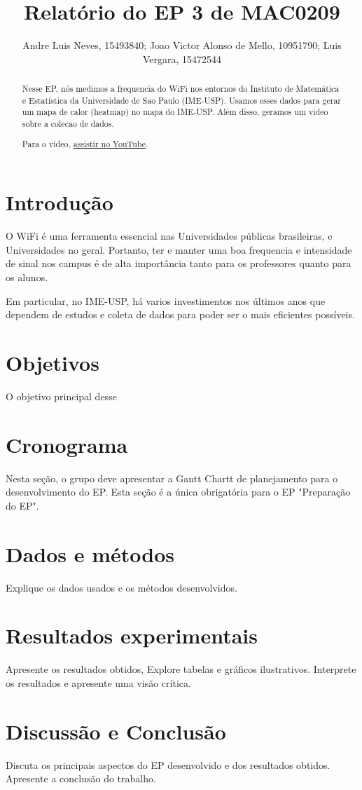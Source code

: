 \documentclass{article}
\title{Relatório do EP 3 de MAC0209}
\author{Andre Luis Neves, 15493840; Joao Victor Alonso de Mello, 10951790; Luis Vergara, 15472544}
\begin{document}
\maketitle


\begin{abstract}
  Nesse EP, nós medimos a frequencia do WiFi nos entornos do Instituto de Matemática e Estatística
  da Universidade de Sao Paulo (IME-USP). Usamos esses dados para gerar um mapa de calor (heatmap)
  no mapa do IME-USP. Além disso, geramos um video sobre a colecao de dados. 

Para o video, \href{https://youtube.com}{assistir no YouTube}.

\end{abstract}

\newpage

\tableofcontents

\newpage

\section{Introdução}
O WiFi é uma ferramenta essencial nas Universidades públicas brasileiras, e Universidades no geral.
Portanto, ter e manter uma boa frequencia e intensidade de sinal nos campus é de alta importância
tanto para os professores quanto para os alunos.  

Em particular, no IME-USP, há varios investimentos nos últimos anos que dependem de estudos e coleta
de dados para poder ser o mais eficientes possíveis. 

\section{Objetivos}
O objetivo principal desse 

\section{Cronograma}

Nesta seção, o grupo deve apresentar a Gantt Chartt de planejamento para o desenvolvimento do EP. Esta seção é a única obrigatória para o EP "Preparação do EP".

\section{Dados e métodos}

Explique os dados usados e os métodos desenvolvidos.

\section{Resultados experimentais}

Apresente os resultados obtidos, Explore tabelas e gráficos ilustrativos. Interprete os resultados e apresente uma visão crítica.

\section{Discussão e Conclusão}

Discuta os principais aspectos do EP desenvolvido e dos resultados obtidos. Apresente a conclusão do trabalho.
\end{document}
